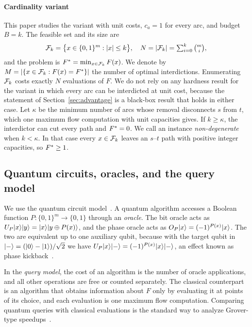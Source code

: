 \paragraph{Cardinality variant} This paper studies the variant with unit costs, $c_a=1$ for every arc, and budget $B=k$. The feasible set and its size are
\begin{equation}\label{eq:Fk}
  \mathcal{F}_k = \bigl\{ x\in\{0,1\}^{m} : |x|\le k \bigr\},\quad N = |\mathcal{F}_k| = \textstyle\sum_{i=0}^{k}\binom{m}{i},
\end{equation}
and the problem is $F^{*}=\min_{x\in\mathcal{F}_k}F(x)$. We denote by $M=|\{x\in\mathcal{F}_k : F(x)=F^{*}\}|$ the number of optimal interdictions. Enumerating $\mathcal{F}_k$ costs exactly $N$ evaluations of $F$. We do not rely on any hardness result for the variant in which every arc can be interdicted at unit cost, because the statement of Section~\ref{sec:advantage} is a black-box result that holds in either case. Let $\kappa$ be the minimum number of arcs whose removal disconnects $s$ from $t$, which one maximum flow computation with unit capacities gives. If $k\ge\kappa$, the interdictor can cut every path and $F^{*}=0$. We call an instance \emph{non-degenerate} when $k<\kappa$. In that case every $x\in\mathcal{F}_k$ leaves an $s$--$t$ path with positive integer capacities, so $F^{*}\ge 1$.

\subsection{Quantum circuits, oracles, and the query model}\label{sec:bg-query}

We use the quantum circuit model~\cite{nielsen2010}. A quantum algorithm accesses a Boolean function $P:\{0,1\}^{m}\to\{0,1\}$ through an \emph{oracle}. The bit oracle acts as $U_P\lvert x \rangle\lvert y \rangle=\lvert x \rangle\lvert y\oplus P(x) \rangle$, and the phase oracle acts as $O_P\lvert x \rangle=(-1)^{P(x)}\lvert x \rangle$. The two are equivalent up to one auxiliary qubit, because with the target qubit in $\lvert - \rangle=(\lvert 0 \rangle-\lvert 1 \rangle)/\sqrt{2}$ we have $U_P\lvert x \rangle\lvert - \rangle=(-1)^{P(x)}\lvert x \rangle\lvert - \rangle$, an effect known as phase kickback~\cite{nielsen2010}.

In the \emph{query model}, the cost of an algorithm is the number of oracle applications, and all other operations are free or counted separately. The classical counterpart is an algorithm that obtains information about $F$ only by evaluating it at points of its choice, and each evaluation is one maximum flow computation. Comparing quantum queries with classical evaluations is the standard way to analyze Grover-type speedups~\cite{bbbv1997,bhmt2002}.

